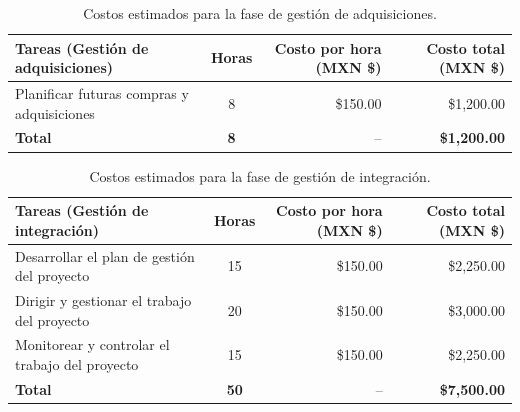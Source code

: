 \begin{table}[H]
	\centering
	\renewcommand{\arraystretch}{1.6}
	\setlength{\tabcolsep}{10pt}
	\Huge
	\begin{adjustbox}{max width=\textwidth}
		\begin{tabular}{|p{9.5cm}|c|r|r|}
			\hline
			\textbf{Tareas (Gestión de adquisiciones)} & \textbf{Horas} & \textbf{Costo por hora (MXN \$)} & \textbf{Costo total (MXN \$)} \\ \hline
			Planificar futuras compras y adquisiciones & 8 & \$150.00 & \$1,200.00 \\ \hline
			\textbf{Total} & \textbf{8} & -- & \textbf{\$1,200.00} \\ \hline
		\end{tabular}
	\end{adjustbox}
	\caption{Costos estimados para la fase de gestión de adquisiciones.}
	\label{tab:costos_adquisiciones_nuevo}
\end{table}

\begin{table}[H]
	\centering
	\renewcommand{\arraystretch}{1.6}
	\setlength{\tabcolsep}{10pt}
	\Huge
	\begin{adjustbox}{max width=\textwidth}
		\begin{tabular}{|p{9.5cm}|c|r|r|}
			\hline
			\textbf{Tareas (Gestión de integración)} & \textbf{Horas} & \textbf{Costo por hora (MXN \$)} & \textbf{Costo total (MXN \$)} \\ \hline
			Desarrollar el plan de gestión del proyecto & 15 & \$150.00 & \$2,250.00 \\ \hline
			Dirigir y gestionar el trabajo del proyecto & 20 & \$150.00 & \$3,000.00 \\ \hline
			Monitorear y controlar el trabajo del proyecto & 15 & \$150.00 & \$2,250.00 \\ \hline
			\textbf{Total} & \textbf{50} & -- & \textbf{\$7,500.00} \\ \hline
		\end{tabular}
	\end{adjustbox}
	\caption{Costos estimados para la fase de gestión de integración.}
	\label{tab:costos_integracion_nuevo}
\end{table}

